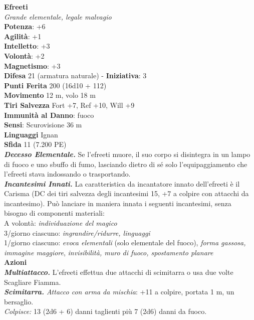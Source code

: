 \begin{multicols}{2}
\medskip\textbf{Efreeti}\\
\emph{Grande elementale, legale malvagio}\\
\textbf{Potenza}: +6\\
\textbf{Agilità}: +1\\
\textbf{Intelletto}: +3\\
\textbf{Volontà}: +2\\
\textbf{Magnetismo}: +3\\
\textbf{Difesa} 21 (armatura naturale) - \textbf{Iniziativa}: 3\\
\textbf{Punti Ferita} 200 (16d10 + 112) \\
\textbf{Movimento} 12 m, volo 18 m\\
\textbf{Tiri Salvezza} Fort +7, Ref +10, Will +9\\
\textbf{Immunità al Danno}: fuoco\\
\textbf{Sensi}: Scurovisione 36 m\\
\textbf{Linguaggi} Ignan\\
\textbf{Sfida} 11 (7.200 PE)\smallskip\\
\emph{\textbf{Decesso Elementale.}} Se l'efreeti muore, il suo corpo si disintegra in un lampo di fuoco e uno sbuffo di fumo, lasciando dietro di sé solo l'equipaggiamento che l'efreeti stava indossando o trasportando.\\
\emph{\textbf{Incantesimi Innati.}} La caratteristica da incantatore innato dell'efreeti è il Carisma (DC dei tiri salvezza degli incantesimi 15, +7 a colpire con attacchi da incantesimo). Può lanciare in maniera innata i seguenti incantesimi, senza bisogno di componenti materiali:\\
A volontà: \emph{individuazione del magico}\\
3/giorno ciascuno: \emph{ingrandire/ridurre, linguaggi}\\
1/giorno ciascuno: \emph{evoca elementali} (solo elementale del fuoco), \emph{forma gassosa, immagine maggiore}, \emph{invisibilità, muro di fuoco, spostamento planare}\\
\smallskip\textbf{Azioni}\\
\emph{\textbf{Multiattacco.}} L'efreeti effettua due attacchi di scimitarra o usa due volte Scagliare Fiamma.\\
\emph{\textbf{Scimitarra.} Attacco con arma da mischia}: +11 a colpire, portata 1 m, un bersaglio.\\
\emph{Colpisce:} 13 (2d6 + 6) danni taglienti più 7 (2d6) danni da fuoco.\\

\end{multicols}
